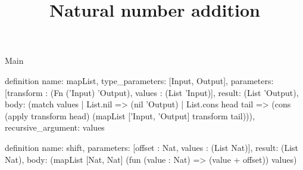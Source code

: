 \begin{lexlean}{Main}
\title{Natural number addition}
\begin{semanticmodule}
definition{
  name: mapList,
  type_parameters: [Input, Output],
  parameters: [transform : (Fn ('Input) 'Output), values : (List 'Input)],
  result: (List 'Output),
  body: (match values
    | List.nil => (nil 'Output)
    | List.cons head tail => (cons (apply transform head) (mapList ['Input, 'Output] transform tail))),
  recursive_argument: values
}

definition{
  name: shift,
  parameters: [offset : Nat, values : (List Nat)],
  result: (List Nat),
  body: (mapList [Nat, Nat] (fun (value : Nat) => (value + offset)) values)
}
\end{semanticmodule}
\end{lexlean}
